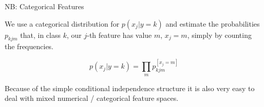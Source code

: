 \documentclass[11pt,compress,t,notes=noshow, xcolor=table]{beamer}
\begin{document}
\begin{frame}{NB: Categorical Features}

We use a categorical distribution for $p(x_j | y = k)$ and estimate the probabilities $p_{kjm}$ that, in class $k$, our $j$-th feature has value $m$, $x_j = m$, simply by counting the frequencies.

$$
p(x_j | y = k) = \prod_m p_{kjm}^{[x_j = m]}
$$

Because of the simple conditional independence structure it is also very easy to deal with mixed numerical / categorical feature spaces.

\begin{flushright}

\end{flushright}
\end{frame}
\end{document}
